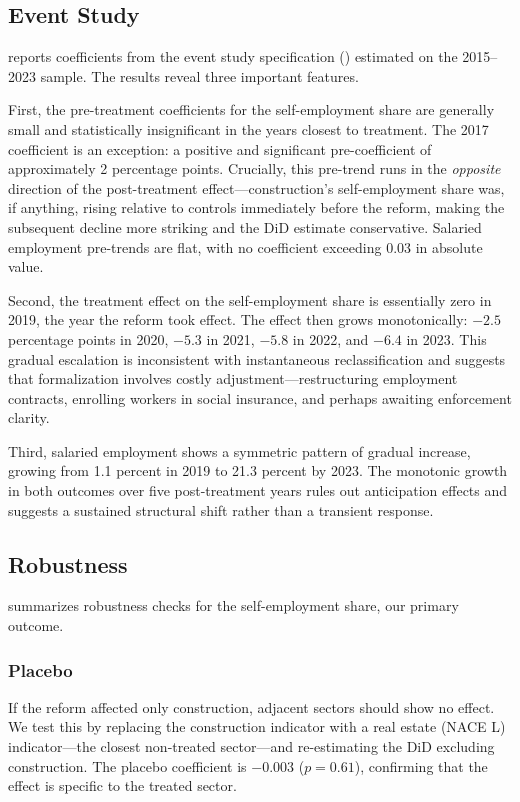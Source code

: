 \documentclass[12pt]{article}
\begin{document}


\subsection{Event Study}

 reports coefficients from the event study specification () estimated on the 2015--2023 sample. The results reveal three important features.

First, the pre-treatment coefficients for the self-employment share are generally small and statistically insignificant in the years closest to treatment. The 2017 coefficient is an exception: a positive and significant pre-coefficient of approximately 2 percentage points. Crucially, this pre-trend runs in the \textit{opposite} direction of the post-treatment effect---construction's self-employment share was, if anything, rising relative to controls immediately before the reform, making the subsequent decline more striking and the DiD estimate conservative. Salaried employment pre-trends are flat, with no coefficient exceeding 0.03 in absolute value.

Second, the treatment effect on the self-employment share is essentially zero in 2019, the year the reform took effect. The effect then grows monotonically: $-2.5$ percentage points in 2020, $-5.3$ in 2021, $-5.8$ in 2022, and $-6.4$ in 2023. This gradual escalation is inconsistent with instantaneous reclassification and suggests that formalization involves costly adjustment---restructuring employment contracts, enrolling workers in social insurance, and perhaps awaiting enforcement clarity.

Third, salaried employment shows a symmetric pattern of gradual increase, growing from 1.1 percent in 2019 to 21.3 percent by 2023. The monotonic growth in both outcomes over five post-treatment years rules out anticipation effects and suggests a sustained structural shift rather than a transient response.



\subsection{Robustness}

 summarizes robustness checks for the self-employment share, our primary outcome.

\subsubsection*{Placebo} If the reform affected only construction, adjacent sectors should show no effect. We test this by replacing the construction indicator with a real estate (NACE L) indicator---the closest non-treated sector---and re-estimating the DiD excluding construction. The placebo coefficient is $-0.003$ ($p = 0.61$), confirming that the effect is specific to the treated sector.
\end{document}

